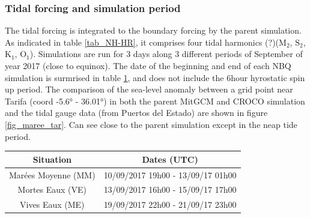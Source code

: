 \subsubsection{Tidal forcing and simulation period}
The tidal forcing is integrated to the boundary forcing by the parent simulation. As indicated in table \ref{tab_NH-HR},  it comprises four tidal harmonics (?)($\text{M}_{\text{2}}$, $\text{S}_{\text{2}}$, $\text{K}_{\text{1}}$, $\text{O}_{\text{1}}$). Simulations are run for 3 days along 3 different periods of September of year 2017 (close to equinox). The date of the beginning and end of each NBQ simulation is surmrised in table \ref{tab_dates_MIV}, and does not include the 6hour hyrostatic spin up period. The comparison of the sea-level anomaly between a grid point near Tarifa (coord -5.6° - 36.01°) in both the parent MitGCM and CROCO simulation and the tidal gauge data (from Puertos del Estado) are shown in figure \ref{fig_maree_tar}. Can see close to the parent simulation except in the neap tide period.

\begin{table}[h]
        \centering
        \begin{tabular}{|c|c|}
                \hline
                Situation & Dates (UTC)\\
                \hline
                Marées Moyenne (MM) & 10/09/2017 19h00 - 13/09/17 01h00  \\
                Mortes Eaux (VE) & 13/09/2017 16h00 - 15/09/17 17h00 \\
                Vives Eaux (ME) & 19/09/2017 22h00 - 21/09/17 23h00  \\
                \hline
        \end{tabular}
        \label{tab_dates_MIV}
\end{table}

